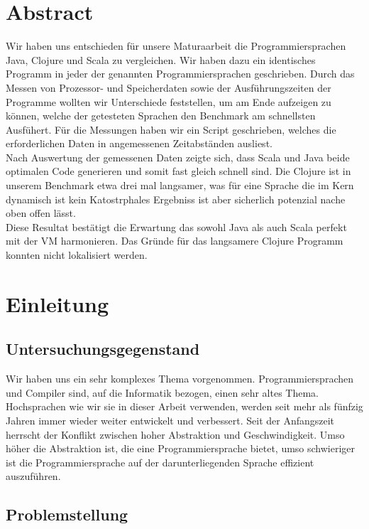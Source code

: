 \documentclass{fancydocument}
\begin{document}
\section{Abstract}
Wir haben uns entschieden für unsere Maturaarbeit die
Programmiersprachen Java, Clojure und Scala zu vergleichen. Wir haben
dazu ein identisches Programm in jeder der genannten
Programmiersprachen geschrieben. Durch das Messen von Prozessor- und
Speicherdaten sowie der Ausführungszeiten der Programme wollten wir
Unterschiede feststellen, um am Ende aufzeigen zu können, welche der
getesteten Sprachen den Benchmark am schnellsten Ausf\"uhert. Für die
Messungen haben wir ein Script geschrieben,
welches die erforderlichen Daten in angemessenen Zeitabständen
ausliest. 
\\
Nach Auswertung der gemessenen Daten zeigte sich, dass Scala
und Java beide optimalen Code generieren und somit fast gleich schnell
sind. Die Clojure ist in unserem Benchmark
etwa drei mal langsamer, was für eine Sprache die im Kern dynamisch
ist kein Katostrphales Ergebniss ist aber sicherlich potenzial nache
oben offen l\"asst. 
\\
Diese Resultat best\"atigt die Erwartung das
sowohl Java als auch Scala perfekt mit der VM harmonieren.
Das Gr\"unde f\"ur das langsamere Clojure Programm konnten nicht
lokalisiert werden. 


\section{Einleitung}

\subsection{Untersuchungsgegenstand}

Wir haben uns ein sehr komplexes Thema vorgenommen. Programmiersprachen und Compiler sind, auf die Informatik bezogen, einen sehr altes Thema. \\
Hochsprachen wie wir sie in dieser Arbeit verwenden, werden seit mehr
als fünfzig Jahren immer wieder weiter entwickelt und verbessert. Seit
der Anfangszeit herrscht der Konflikt zwischen hoher Abstraktion und
Geschwindigkeit. Umso höher die Abstraktion ist, die eine
Programmiersprache bietet, umso schwieriger ist die Programmiersprache
auf der darunterliegenden Sprache effizient auszuführen.

\subsection{Problemstellung}
\end{document}
